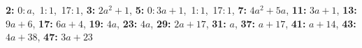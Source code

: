 \textsf{\bfseries 2:} 0:\,$a$,\ 1:\,$1$,\ 17:\,$1$, \textsf{\bfseries 3:} $2a^2 + 1$, \textsf{\bfseries 5:} 0:\,$3a + 1$,\ 1:\,$1$,\ 17:\,$1$, \textsf{\bfseries 7:} $4a^2 + 5a$, \textsf{\bfseries 11:} $3a + 1$, \textsf{\bfseries 13:} $9a + 6$, \textsf{\bfseries 17:} $6a + 4$, \textsf{\bfseries 19:} $4a$, \textsf{\bfseries 23:} $4a$, \textsf{\bfseries 29:} $2a + 17$, \textsf{\bfseries 31:} $a$, \textsf{\bfseries 37:} $a + 17$, \textsf{\bfseries 41:} $a + 14$, \textsf{\bfseries 43:} $4a + 38$, \textsf{\bfseries 47:} $3a + 23$